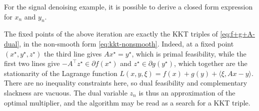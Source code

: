  
 \begin{remark}
     For the signal denoising example, it is possible to derive a closed form expression for $x_n$ and $y_n$.
 \end{remark}

 \begin{remark}
     The fixed points of the above iteration are exactly the KKT triples of \eqref{eq:f+g+A-dual}, in the non-smooth form \eqref{eq:kkt-nonsmooth}. Indeed, at a fixed point $(x^\star,y^\star,z^\star)$ the third line gives $Ax^\star=y^\star$, which is primal feasibility, while the first two lines give $-A^\top z^\star\in \partial f(x^\star)$ and $z^\star \in \partial g(y^\star)$, which together are the stationarity of the Lagrange function $L(x,y,\xi)=f(x)+g(y)+\langle \xi,Ax-y\rangle$. There are no inequality constraints here, so dual feasibility and complementary slackness are vacuous. The dual variable $z_n$ is thus an approximation of the optimal multiplier, and the algorithm may be read as a search for a KKT triple.
 \end{remark}
 
